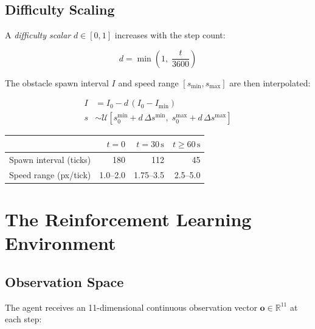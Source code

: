 \documentclass[12pt]{article}
\begin{document}
\subsection{Difficulty Scaling}

A \textit{difficulty scalar} $d \in [0,1]$ increases with the step count:

\begin{equation}
    d = \min\!\left(1,\; \frac{t}{3600}\right)
\end{equation}

The obstacle spawn interval $I$ and speed range $[s_{\min}, s_{\max}]$ are then interpolated:

\begin{align}
    I & = I_0 - d\,(I_0 - I_{\min})                                                                       \\
    s & \sim \mathcal{U}\!\left[s_0^{\min} + d\,\Delta s^{\min},\; s_0^{\max} + d\,\Delta s^{\max}\right]
\end{align}

\begin{center}
    \renewcommand{\arraystretch}{1.3}
    \begin{tabular}{lrrr}
        \toprule
                               & $t = 0$  & $t = 30\,\text{s}$ & $t \geq 60\,\text{s}$ \\
        \midrule
        Spawn interval (ticks) & 180      & 112                & 45                    \\
        Speed range (px/tick)  & 1.0--2.0 & 1.75--3.5          & 2.5--5.0              \\
        \bottomrule
    \end{tabular}
\end{center}

\section{The Reinforcement Learning Environment}

\subsection{Observation Space}

The agent receives an 11-dimensional continuous observation vector $\mathbf{o} \in \mathbb{R}^{11}$ at each step:
\end{document}
